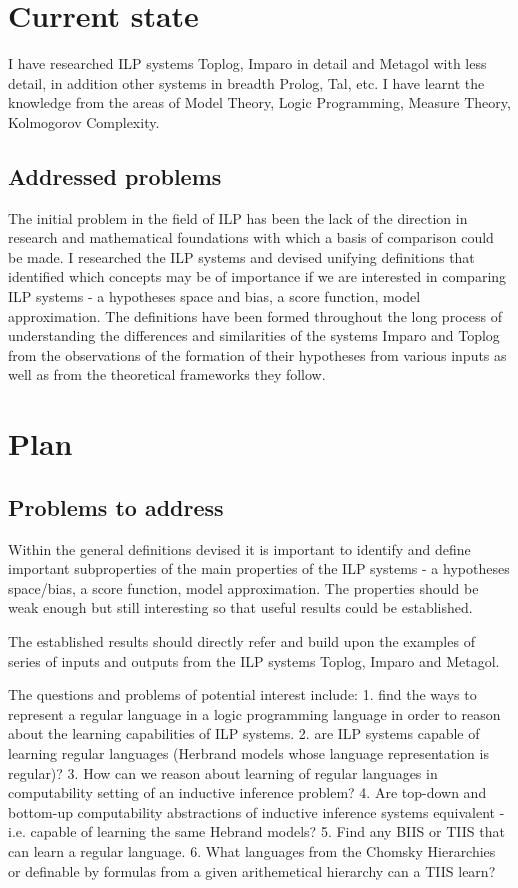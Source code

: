 \section{Current state}
I have researched ILP systems Toplog, Imparo in detail and Metagol with less detail, in addition other systems in breadth Prolog, Tal, etc. I have learnt the knowledge from the areas of Model Theory, Logic Programming, Measure Theory, Kolmogorov Complexity.

\subsection{Addressed problems}
The initial problem in the field of ILP has been the lack of the direction in research and mathematical foundations with which a basis of comparison could be made. I researched the ILP systems and devised unifying definitions that identified which concepts may be of importance if we are interested in comparing ILP systems - a hypotheses space and bias, a score function, model approximation. The definitions have been formed throughout the long process of understanding the differences and similarities of the systems Imparo and Toplog from the observations of the formation of their hypotheses from various inputs as well as from the theoretical frameworks they follow.

\section{Plan}

\subsection{Problems to address}
Within the general definitions devised it is important to identify and define important subproperties of the main properties of the ILP systems - a hypotheses space/bias, a score function, model approximation. The properties should be weak enough but still interesting so that useful results could be established.

The established results should directly refer and build upon the examples of series of inputs and outputs from the ILP systems Toplog, Imparo and Metagol.

The questions and problems of potential interest include:
1. find the ways to represent a regular language in a logic programming language in order to reason about the learning capabilities of ILP systems.
2. are ILP systems capable of learning regular languages (Herbrand models whose language representation is regular)?
3. How can we reason about learning of regular languages in computability setting of an inductive inference problem?
4. Are top-down and bottom-up computability abstractions of inductive inference systems equivalent - i.e. capable of learning the same Hebrand models?
5. Find any BIIS or TIIS that can learn a regular language.
6. What languages from the Chomsky Hierarchies or definable by formulas from a given arithemetical hierarchy can a TIIS learn?

